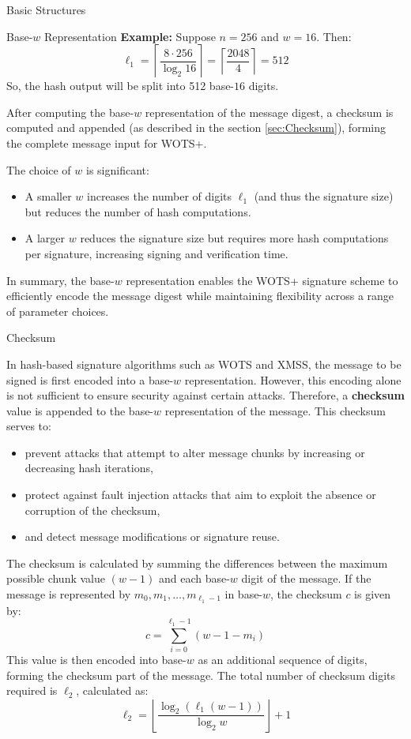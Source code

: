 \begin{section}{Basic Structures}{\label{sec1}}
\begin{subsection}{Base-\texorpdfstring{$w$}{w} Representation }
\textbf{Example:}  
Suppose $n = 256$ and $w = 16$. Then:
\[
\ell_1 = \left\lceil \frac{8 \cdot 256}{\log_2 16} \right\rceil = \left\lceil \frac{2048}{4} \right\rceil = 512
\]
So, the hash output will be split into 512 base-$16$ digits.

After computing the base-$w$ representation of the message digest, a checksum is computed and appended (as described in the section \ref{sec:Checksum}), forming the complete message input for WOTS+.

The choice of $w$ is significant: 
\begin{itemize}
    \item A smaller $w$ increases the number of digits $\ell_1$ (and thus the signature size) but reduces the number of hash computations.
    \item A larger $w$ reduces the signature size but requires more hash computations per signature, increasing signing and verification time.
\end{itemize}

In summary, the base-$w$ representation enables the WOTS+ signature scheme to efficiently encode the message digest while maintaining flexibility across a range of parameter choices.

\end{subsection}


\begin{subsection}{Checksum}{\label{sec:Checksum}}

In hash-based signature algorithms such as WOTS and XMSS, the message to be signed is first encoded into a base-$w$ representation. However, this encoding alone is not sufficient to ensure security against certain attacks. Therefore, a \textbf{checksum} value is appended to the base-$w$ representation of the message. This checksum serves to:

\begin{itemize}
    \item prevent attacks that attempt to alter message chunks by increasing or decreasing hash iterations,
    \item protect against fault injection attacks that aim to exploit the absence or corruption of the checksum,
    \item and detect message modifications or signature reuse.
\end{itemize}

The checksum is calculated by summing the differences between the maximum possible chunk value $(w-1)$ and each base-$w$ digit of the message. If the message is represented by $m_0, m_1, \ldots, m_{\ell_1-1}$ in base-$w$, the checksum $c$ is given by:
\[
c = \sum_{i=0}^{\ell_1-1} (w - 1 - m_i)
\]
This value is then encoded into base-$w$ as an additional sequence of digits, forming the checksum part of the message. The total number of checksum digits required is $\ell_2$, calculated as:
\[
\ell_2 = \left\lfloor \frac{\log_2(\ell_1(w-1))}{\log_2 w} \right\rfloor + 1
\]


\end{subsection}
\end{section}
